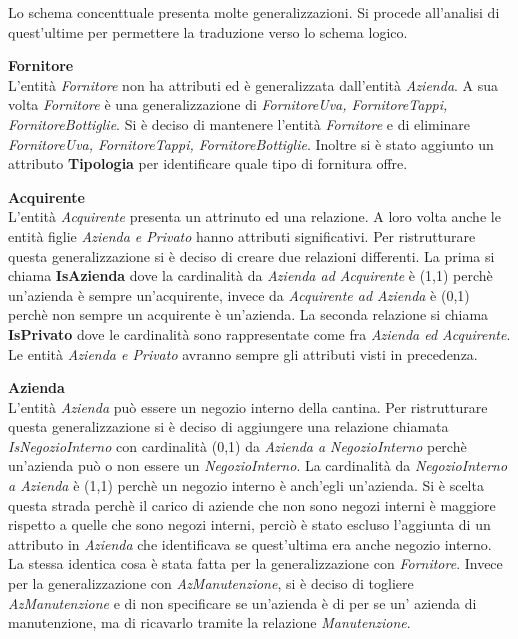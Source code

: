 Lo schema concenttuale presenta molte generalizzazioni. Si procede all'analisi di quest'ultime per permettere la traduzione verso lo schema logico.\\

\begin{flushleft}
	\textbf{\large{Fornitore}}\\
	L'entità \emph{Fornitore} non ha attributi ed è generalizzata dall'entità \emph{Azienda}. A sua volta \emph{Fornitore} è una generalizzazione di \emph{FornitoreUva, FornitoreTappi, FornitoreBottiglie}. Si è deciso di mantenere l'entità \emph{Fornitore} e di eliminare \emph{FornitoreUva, FornitoreTappi, FornitoreBottiglie}. Inoltre si è stato aggiunto un attributo \textbf{Tipologia} per identificare quale tipo di fornitura offre.
\end{flushleft}


\begin{flushleft}
	\textbf{\large{Acquirente}}\\
	L'entità \emph{Acquirente} presenta un attrinuto ed una relazione. A loro volta anche le entità figlie \emph{Azienda e Privato} hanno attributi significativi. Per ristrutturare questa generalizzazione si è deciso di creare due relazioni differenti. La prima si chiama \textbf{IsAzienda} dove la cardinalità da \emph{Azienda ad Acquirente} è (1,1) perchè un'azienda è sempre un'acquirente, invece da \emph{Acquirente ad Azienda} è (0,1) perchè non sempre un acquirente è un'azienda.
	La seconda relazione si chiama \textbf{IsPrivato} dove le cardinalità sono rappresentate come fra \emph{Azienda ed Acquirente}. Le entità \emph{Azienda e Privato} avranno sempre gli attributi visti in precedenza.
\end{flushleft}

\begin{flushleft}
	\textbf{\large{Azienda}}\\
	L'entità \emph{Azienda} può essere un negozio interno della cantina. Per ristrutturare questa generalizzazione si è deciso di aggiungere una relazione chiamata \emph{IsNegozioInterno} con cardinalità (0,1) da \emph{Azienda a NegozioInterno} perchè un'azienda può o non essere un \emph{NegozioInterno}. La cardinalità da \emph{NegozioInterno a Azienda} è (1,1) perchè un negozio interno è anch'egli un'azienda. Si è scelta questa strada perchè il carico di aziende che non sono negozi interni è maggiore rispetto a quelle che sono negozi interni, perciò è stato escluso l'aggiunta di un attributo in \emph{Azienda} che identificava se quest'ultima era anche negozio interno. La stessa identica cosa è stata fatta per la generalizzazione con \emph{Fornitore}. Invece per la generalizzazione con \emph{AzManutenzione}, si è deciso di togliere \emph{AzManutenzione} e di non specificare se un'azienda è di per se un' azienda di manutenzione, ma di ricavarlo tramite la relazione \emph{Manutenzione}.
\end{flushleft}

